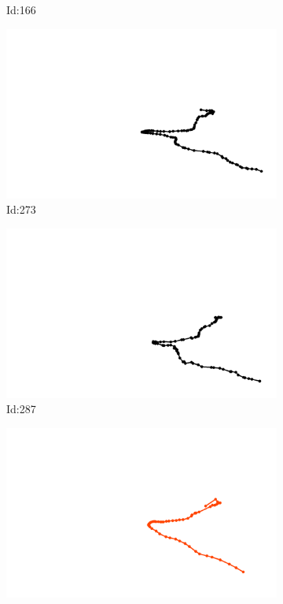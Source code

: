 \documentclass[12pt,twoside]{report}
\begin{document}
\begin{figure}
\begin{subfigure}[b]{0.20\textwidth}
\caption{Id:166}
\end{subfigure}
\begin{subfigure}[b]{0.20\textwidth}
\centering
\includegraphics[width=\textwidth]{../trajectories/273.png}
\caption{Id:273}
\end{subfigure}
\begin{subfigure}[b]{0.20\textwidth}
\centering
\includegraphics[width=\textwidth]{../trajectories/287.png}
\caption{Id:287}
\end{subfigure}
\begin{subfigure}[b]{0.20\textwidth}
\centering
\includegraphics[width=\textwidth]{../trajectories/356.png}

\end{subfigure}
\end{figure}
\end{document}
